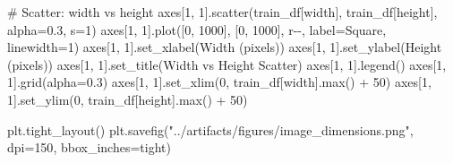 \documentclass[
  letterpaper,
  DIV=11,
  numbers=noendperiod]{scrartcl}
\newenvironment{Shaded}{\begin{snugshade}}{\end{snugshade}}
\newcommand{\BuiltInTok}[1]{\textcolor[rgb]{0.00,0.23,0.31}{#1}}
\newcommand{\CommentTok}[1]{\textcolor[rgb]{0.37,0.37,0.37}{#1}}
\newcommand{\DecValTok}[1]{\textcolor[rgb]{0.68,0.00,0.00}{#1}}
\newcommand{\FloatTok}[1]{\textcolor[rgb]{0.68,0.00,0.00}{#1}}
\newcommand{\NormalTok}[1]{\textcolor[rgb]{0.00,0.23,0.31}{#1}}
\newcommand{\OperatorTok}[1]{\textcolor[rgb]{0.37,0.37,0.37}{#1}}
\newcommand{\StringTok}[1]{\textcolor[rgb]{0.13,0.47,0.30}{#1}}
\renewenvironment{Shaded}{%
  \begin{tcolorbox}[%
    enhanced,%
    colback=codebg,%
    colframe=codebg,%
    borderline west={3pt}{0pt}{sectionblue},%
    boxrule=0pt,%
    arc=0pt,%
    boxsep=5pt,%
    left=2mm,%
    right=2mm,%
    top=2mm,%
    bottom=2mm%
  ]%
}{%
  \end{tcolorbox}%
}
\begin{document}
\begin{Shaded}
\begin{Highlighting}[]
\CommentTok{\# Scatter: width vs height}
\NormalTok{axes[}\DecValTok{1}\NormalTok{, }\DecValTok{1}\NormalTok{].scatter(train\_df[}\StringTok{\textquotesingle{}width\textquotesingle{}}\NormalTok{], train\_df[}\StringTok{\textquotesingle{}height\textquotesingle{}}\NormalTok{], alpha}\OperatorTok{=}\FloatTok{0.3}\NormalTok{, s}\OperatorTok{=}\DecValTok{1}\NormalTok{)}
\NormalTok{axes[}\DecValTok{1}\NormalTok{, }\DecValTok{1}\NormalTok{].plot([}\DecValTok{0}\NormalTok{, }\DecValTok{1000}\NormalTok{], [}\DecValTok{0}\NormalTok{, }\DecValTok{1000}\NormalTok{], }\StringTok{\textquotesingle{}r{-}{-}\textquotesingle{}}\NormalTok{, label}\OperatorTok{=}\StringTok{\textquotesingle{}Square\textquotesingle{}}\NormalTok{, linewidth}\OperatorTok{=}\DecValTok{1}\NormalTok{)}
\NormalTok{axes[}\DecValTok{1}\NormalTok{, }\DecValTok{1}\NormalTok{].set\_xlabel(}\StringTok{\textquotesingle{}Width (pixels)\textquotesingle{}}\NormalTok{)}
\NormalTok{axes[}\DecValTok{1}\NormalTok{, }\DecValTok{1}\NormalTok{].set\_ylabel(}\StringTok{\textquotesingle{}Height (pixels)\textquotesingle{}}\NormalTok{)}
\NormalTok{axes[}\DecValTok{1}\NormalTok{, }\DecValTok{1}\NormalTok{].set\_title(}\StringTok{\textquotesingle{}Width vs Height Scatter\textquotesingle{}}\NormalTok{)}
\NormalTok{axes[}\DecValTok{1}\NormalTok{, }\DecValTok{1}\NormalTok{].legend()}
\NormalTok{axes[}\DecValTok{1}\NormalTok{, }\DecValTok{1}\NormalTok{].grid(alpha}\OperatorTok{=}\FloatTok{0.3}\NormalTok{)}
\NormalTok{axes[}\DecValTok{1}\NormalTok{, }\DecValTok{1}\NormalTok{].set\_xlim(}\DecValTok{0}\NormalTok{, train\_df[}\StringTok{\textquotesingle{}width\textquotesingle{}}\NormalTok{].}\BuiltInTok{max}\NormalTok{() }\OperatorTok{+} \DecValTok{50}\NormalTok{)}
\NormalTok{axes[}\DecValTok{1}\NormalTok{, }\DecValTok{1}\NormalTok{].set\_ylim(}\DecValTok{0}\NormalTok{, train\_df[}\StringTok{\textquotesingle{}height\textquotesingle{}}\NormalTok{].}\BuiltInTok{max}\NormalTok{() }\OperatorTok{+} \DecValTok{50}\NormalTok{)}

\NormalTok{plt.tight\_layout()}
\NormalTok{plt.savefig(}\StringTok{"../artifacts/figures/image\_dimensions.png"}\NormalTok{, dpi}\OperatorTok{=}\DecValTok{150}\NormalTok{, bbox\_inches}\OperatorTok{=}\StringTok{\textquotesingle{}tight\textquotesingle{}}\NormalTok{)}


\end{Highlighting}
\end{Shaded}
\end{document}
